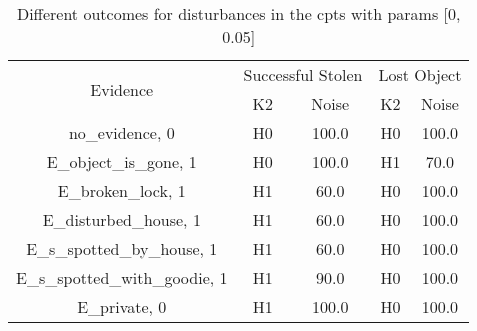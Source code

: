 \begin{table}\begin{tabular}{c|cc|cc}\toprule\multirow{2}{*}{Evidence} & \multicolumn{2}{c}{Successful Stolen} & \multicolumn{2}{c}{Lost Object} \\& {K2} & {Noise} & {K2} & {Noise} \\\midrule
no\_evidence, 0 & H0&100.0&H0&100.0\\E\_object\_is\_gone, 1 & H0&100.0&H1&70.0\\E\_broken\_lock, 1 & H1&60.0&H0&100.0\\E\_disturbed\_house, 1 & H1&60.0&H0&100.0\\E\_s\_spotted\_by\_house, 1 & H1&60.0&H0&100.0\\E\_s\_spotted\_with\_goodie, 1 & H1&90.0&H0&100.0\\E\_private, 0 & H1&100.0&H0&100.0\\\bottomrule\end{tabular}\caption{Different outcomes for disturbances in the cpts with params [0, 0.05]}\end{table}